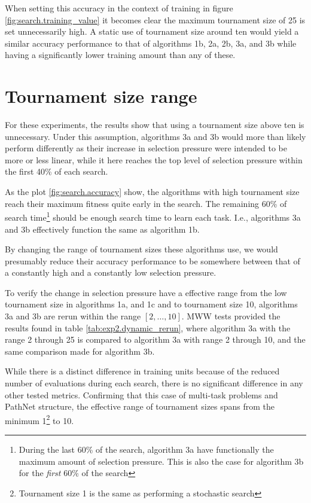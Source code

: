 When setting this accuracy in the context of training in figure \ref{fig:search.training_value} it becomes clear the maximum tournament size of 25 is set unnecessarily high. A static use of tournament size around ten would yield a similar accuracy performance to that of algorithms 1b, 2a, 2b, 3a, and 3b while having a significantly lower training amount than any of these.

\section{Tournament size range}
For these experiments, the results show that using a tournament size above ten is unnecessary. Under this assumption, algorithms 3a and 3b would more than likely perform differently as their increase in selection pressure were intended to be more or less linear, while it here reaches the top level of selection pressure within the first 40\% of each search. 

As the plot \ref{fig:search.accuracy} show, the algorithms with high tournament size reach their maximum fitness quite early in the search. The remaining 60\% of search time\footnote{During the last 60\% of the search, algorithm 3a have functionally the maximum amount of selection pressure. This is also the case for algorithm 3b for the \textit{first} 60\% of the search} should be enough search time to learn each task. I.e., algorithms 3a and 3b effectively function the same as algorithm 1b.

By changing the range of tournament sizes these algorithms use, we would presumably reduce their accuracy performance to be somewhere between that of a constantly high and a constantly low selection pressure.

To verify the change in selection pressure have a effective range from the low tournament size in algorithms 1a, and 1c and to tournament size 10, algorithms 3a and 3b are rerun within the range \([2,\dots,10]\). MWW tests provided the results found in table \ref{tab:exp2.dynamic_rerun}, where algorithm 3a with the range 2 through 25 is compared to algorithm 3a with range 2 through 10, and the same comparison made for algorithm 3b. 



While there is a distinct difference in training units because of the reduced number of evaluations during each search, there is no significant difference in any other tested metrics. Confirming that this case of multi-task problems and PathNet structure, the effective range of tournament sizes spans from the minimum 1\footnote{Tournament size 1 is the same as performing a stochastic search} to 10.

